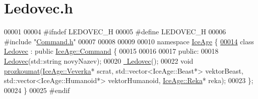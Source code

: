 \hypertarget{Ledovec_8h_source}{}\section{Ledovec.\+h}
\label{Ledovec_8h_source}

\begin{DoxyCode}
00001 
00004 \textcolor{preprocessor}{#ifndef LEDOVEC\_H}
00005 \textcolor{preprocessor}{#define LEDOVEC\_H}
00006 \textcolor{preprocessor}{#include "\hyperlink{Command_8h}{Command.h}"}
00007 
00008 
00009 
00010 \textcolor{keyword}{namespace }\hyperlink{namespaceIceAge}{IceAge} \{
\hypertarget{Ledovec_8h_source.tex_l00014}{}\hyperlink{classIceAge_1_1Ledovec}{00014}     \textcolor{keyword}{class }\hyperlink{classIceAge_1_1Ledovec}{Ledovec} : \textcolor{keyword}{public} \hyperlink{classIceAge_1_1Command}{IceAge::Command} \{
00015 
00016 
00017     \textcolor{keyword}{public}:
00018         \hyperlink{classIceAge_1_1Ledovec_adb1cb86de12b9d72888202bef00ae962}{Ledovec}(std::string novyNazev);
00020         \hyperlink{classIceAge_1_1Ledovec_a7533fa470c0ab65a05c03a0de2b1ba5e}{~Ledovec}();
00022         \textcolor{keywordtype}{void} \hyperlink{classIceAge_1_1Ledovec_a92538e91b889749c03de931e77da8753}{prozkoumat}(\hyperlink{classIceAge_1_1Veverka}{IceAge::Veverka}* scrat, std::vector<IceAge::Beast*> 
      vektorBeast, std::vector<IceAge::Humanoid*> vektorHumanoid, \hyperlink{classIceAge_1_1Reka}{IceAge::Reka}* reka);
00023     \};
00024 \}
00025 \textcolor{preprocessor}{#endif}
\end{DoxyCode}
